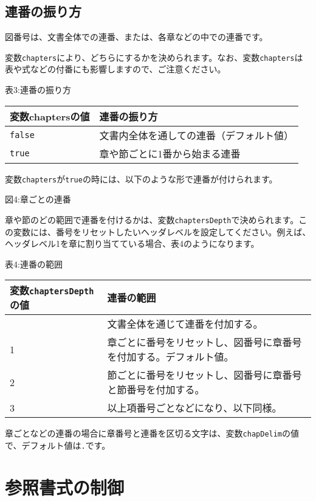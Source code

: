 \subsection{連番の振り方}\label{ux9023ux756aux306eux632fux308aux65b9}

図番号は、文書全体での連番、または、各章などの中での連番です。

変数\texttt{chapters}により、どちらにするかを決められます。なお、変数\texttt{chapters}は表や式などの付番にも影響しますので、ご注意ください。

表3:連番の振り方

\begin{longtable}[]{@{}ll@{}}
\toprule\noalign{}
変数chaptersの値 & 連番の振り方 \\
\midrule\noalign{}
\endhead
\bottomrule\noalign{}
\endlastfoot
\texttt{false} & 文書内全体を通しての連番（デフォルト値） \\
\texttt{true} & 章や節ごとに1番から始まる連番 \\
\end{longtable}

変数\texttt{chapters}が\texttt{true}の時には、以下のような形で連番が付けられます。

図4:章ごとの連番

章や節のどの範囲で連番を付けるかは、変数\texttt{chaptersDepth}で決められます。この変数には、番号をリセットしたいヘッダレベルを設定してください。例えば、ヘッダレベル1を章に割り当てている場合、表4のようになります。

表4:連番の範囲

\begin{longtable}[]{@{}ll@{}}
\toprule\noalign{}
変数\texttt{chaptersDepth}の値 & 連番の範囲 \\
\midrule\noalign{}
\endhead
\bottomrule\noalign{}
\endlastfoot
0 & 文書全体を通じて連番を付加する。 \\
1 &
章ごとに番号をリセットし、図番号に章番号を付加する。デフォルト値。 \\
2 & 節ごとに番号をリセットし、図番号に章番号と節番号を付加する。 \\
3 & 以上項番号ごとなどになり、以下同様。 \\
\end{longtable}

章ごとなどの連番の場合に章番号と連番を区切る文字は、変数\texttt{chapDelim}の値で、デフォルト値は\texttt{.}です。

\section{参照書式の制御}\label{ux53c2ux7167ux66f8ux5f0fux306eux5236ux5fa1}

